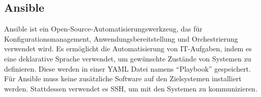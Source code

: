 \subsection{Ansible}\label{c:2_ss:ansible}
Ansible ist ein Open-Source-Automatisierungswerkzeug, das für Konfigurationsmanagement, Anwendungsbereitstellung und Orchestrierung verwendet wird. Es ermöglicht die Automatisierung von IT-Aufgaben, indem es eine deklarative Sprache verwendet, um gewünschte Zustände von Systemen zu definieren. Diese werden in einer \ac{YAML} Datei namens \enquote{Playbook} gespeichert. Für Ansible muss keine zusätzliche Software auf den Zielsystemen installiert werden. Stattdessen verwendet es \ac{SSH}, um mit den Systemen zu kommunizieren. 
\cite{ansible}
